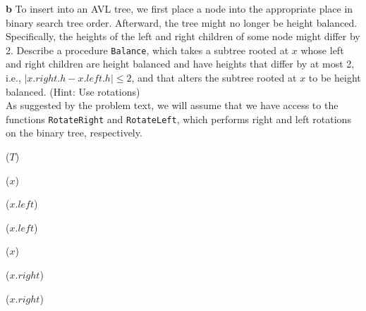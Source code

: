 \documentclass[11pt,english]{article}
\begin{document}
\newpage
\noindent \large{\textbf{b} \mdseries To insert into an AVL tree, we first
place a node into the appropriate place in binary search tree order.
Afterward, the tree might no longer be height balanced. Specifically, the
heights of the left and right children of some node might differ by 2.
Describe a procedure \texttt{Balance}, which takes a subtree rooted at $x$
whose left and right children are height balanced and have heights that differ
by at most 2, i.e., $|x.right.h - x.left.h| \leq 2$, and that alters the
subtree rooted at $x$ to be height balanced. (Hint: Use rotations)}
\\
As suggested by the problem text, we will assume that we have access to the
functions \texttt{RotateRight} and \texttt{RotateLeft}, which performs right
and left rotations on the binary tree, respectively.
\begin{algorithm}
	\BlankLine
	
	\Balance($T$) \\
	\Begin
	{
		{
			\RotateLeft($x$)
			
			{
				\RotateRight($x.left$)
			}
		
			\Balance($x.left$)
		}
		
		{
			\RotateRight($x$)
			
			{
				\RotateLeft($x.right$)
			}
			
			\Balance($x.right$)
		}
	}
\end{algorithm}
\end{document}

